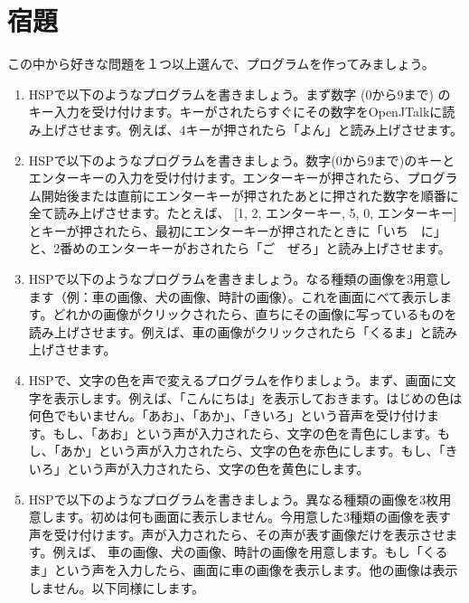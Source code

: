 \section{宿題}
この中から好きな問題を１つ以上選んで、プログラムを作ってみましょう。
\begin{enumerate}
\item HSPで以下のようなプログラムを書きましょう。まず数字 (0から9まで) のキー入力を受け付けます。キーがされたらすぐにその数字をOpenJTalkに読み上げさせます。例えば、4キーが押されたら「よん」と読み上げさせます。
\item HSPで以下のようなプログラムを書きましょう。数字(0から9まで)のキーとエンターキーの入力を受け付けます。エンターキーが押されたら、プログラム開始後または直前にエンターキーが押されたあとに押された数字を順番に全て読み上げさせます。たとえば、 [1, 2, エンターキー, 5, 0, エンターキー]とキーが押されたら、最初にエンターキーが押されたときに「いち　に」と、2番めのエンターキーがおされたら「ご　ぜろ」と読み上げさせます。
\item HSPで以下のようなプログラムを書きましょう。なる種類の画像を3用意します（例：車の画像、犬の画像、時計の画像）。これを画面にべて表示します。どれかの画像がクリックされたら、直ちにその画像に写っているものを読み上げさせます。例えば、車の画像がクリックされたら「くるま」と読み上げさせます。
\item HSPで、文字の色を声で変えるプログラムを作りましょう。まず、画面に文字を表示します。例えば、「こんにちは」を表示しておきます。はじめの色は何色でもいません。「あお」、「あか」、「きいろ」という音声を受け付けます。もし、「あお」という声が入力されたら、文字の色を青色にします。もし、「あか」という声が入力されたら、文字の色を赤色にします。もし、「きいろ」という声が入力されたら、文字の色を黄色にします。
\item HSPで以下のようなプログラムを書きましょう。異なる種類の画像を3枚用意します。初めは何も画面に表示しません。今用意した3種類の画像を表す声を受け付けます。声が入力されたら、その声が表す画像だけを表示させます。例えば、 車の画像、犬の画像、時計の画像を用意します。もし「くるま」という声を入力したら、画面に車の画像を表示します。他の画像は表示しません。以下同様にします。
\end{enumerate}
